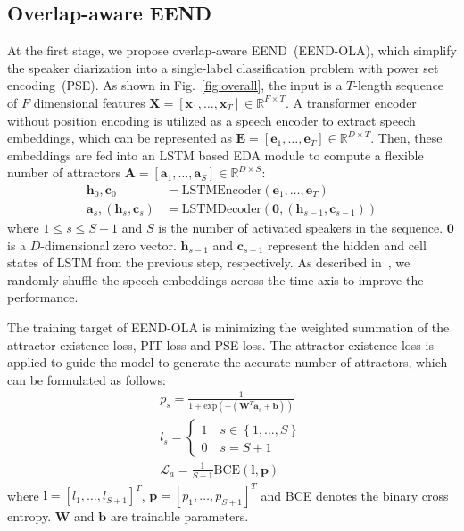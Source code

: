 \documentclass{article}
\begin{document}
\subsection{Overlap-aware EEND}
\label{sec:first_stage}
At the first stage, we propose overlap-aware EEND~(EEND-OLA), which simplify the speaker diarization into a single-label classification problem with power set encoding~(PSE). As shown in Fig.~\ref{fig:overall}, the input is a $T$-length sequence of $F$ dimensional features $\mathbf{X}=[\mathbf{x}_{1},\ldots,\mathbf{x}_{T} ] \in \mathbb{R}^{F \times T}$. A transformer encoder without position encoding is utilized as a speech encoder to extract speech embeddings, which can be represented as $\mathbf{E}=[\mathbf{e}_{1},\ldots,\mathbf{e}_{T}] \in \mathbb{R}^{D \times T}$. Then, these embeddings are fed into an LSTM based EDA module to compute a flexible number of attractors $\mathbf{A}=[\mathbf{a}_{1},\ldots,\mathbf{a}_{S}] \in \mathbb{R}^{D \times S}$:
\begin{equation}
\begin{split}
    \mathbf{h}_{0}, \mathbf{c}_{0} &=\text{LSTMEncoder} \left( \mathbf{e}_{1}, \ldots,\mathbf{e}_{T} \right) \\
    \mathbf{a}_{s}, \left( \mathbf{h}_{s}, \mathbf{c}_{s} \right) &=\text{LSTMDecoder} \left(\mathbf{0}, \left(\mathbf{h}_{s-1}, \mathbf{c}_{s-1} \right) \right)
\end{split}
\end{equation}
where $1 \leq s \leq S+1$ and $S$ is the number of activated speakers in the sequence. $\mathbf{0}$ is a $D$-dimensional zero vector. $\mathbf{h}_{s-1}$ and $\mathbf{c}_{s-1}$ represent the hidden and cell states of LSTM from the previous step, respectively. As described in~\cite{EEND_EDA}, we randomly shuffle the speech embeddings across the time axis to improve the performance.

The training target of EEND-OLA is minimizing the weighted summation of the attractor existence loss, PIT loss and PSE loss. The attractor existence loss is applied to guide the model to generate the accurate number of attractors, which can be formulated as follows:
\begin{equation}
\begin{gathered}
    p_{s} =\frac{1}{1+\text{exp} \left( -\left( \mathbf{W}^{T}\mathbf{a}_{s} + \mathbf{b} \right) \right)}\\
    l_{s}=\begin{cases}
            1\quad s \in \left\{1, \ldots, S \right\} \\
            0 \quad s=S+1
          \end{cases}\\
    \mathcal{L}_{a}=\frac{1}{S+1} \text{BCE} \left(\mathbf{l}, \mathbf{p} \right)
\end{gathered}
\end{equation}
where $\mathbf{l}=\left[ l_{1},\ldots,l_{S+1} \right] ^ {T}$, $\mathbf{p}=\left[ p_{1},\ldots,p_{S+1} \right] ^ {T}$ and BCE denotes the binary cross entropy. $\mathbf{W}$ and $\mathbf{b}$ are trainable parameters.
\end{document}
